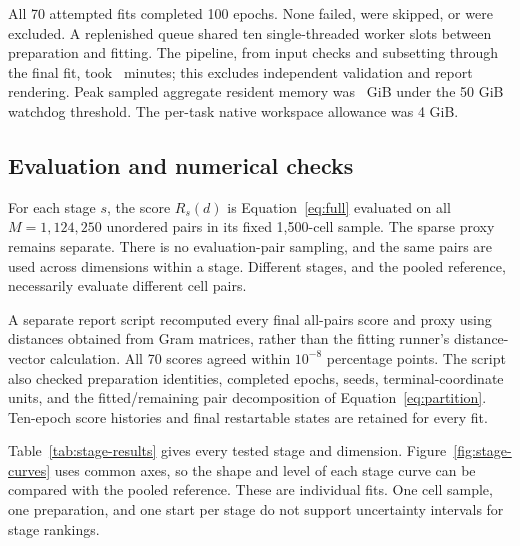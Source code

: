 All 70 attempted fits completed 100 epochs. None failed, were skipped, or
were excluded. A replenished queue shared ten single-threaded worker slots
between preparation and fitting. The pipeline, from input checks and
subsetting through the final fit, took \stageelapsedminutes\ minutes;
this excludes independent validation and report rendering. Peak sampled
aggregate resident memory was \stagepeakmemory\ GiB under the 50 GiB
watchdog threshold. The per-task native workspace allowance was 4 GiB.

\subsection{Evaluation and numerical checks}
For each stage $s$, the score $R_s(d)$ is Equation~\eqref{eq:full} evaluated
on all $M=1,124,250$ unordered pairs in its fixed 1,500-cell sample.
The sparse proxy remains separate. There is no evaluation-pair sampling,
and the same pairs are used across dimensions within a stage. Different
stages, and the pooled reference, necessarily evaluate different cell pairs.

A separate report script recomputed every final all-pairs score and proxy
using distances obtained from Gram matrices, rather than the fitting
runner's distance-vector calculation. All 70 scores agreed within
$10^{-8}$ percentage points. The script also checked preparation identities,
completed epochs, seeds, terminal-coordinate units, and the fitted/remaining
pair decomposition of Equation~\eqref{eq:partition}. Ten-epoch score histories
and final restartable states are retained for every fit.

Table~\ref{tab:stage-results} gives every tested stage and dimension.
Figure~\ref{fig:stage-curves} uses common axes, so the shape and level of
each stage curve can be compared with the pooled reference. These are
individual fits. One cell sample, one preparation, and one start per stage
do not support uncertainty intervals for stage rankings.

\begin{table}[htbp]
\centering\small
\caption{All-pairs RMS relative distance error (percent) after 100 SGD
epochs. Columns are output dimensions; rows are independent stage samples.
The pooled row repeats the existing mixed-stage sample at the same
dimensions. All targets use the same global 1,814-PC coordinate system,
but each row has its own cells and target distances. Lower is better for
that sample's reconstruction criterion; these are not matched-cell
comparisons or replicate means.}
\label{tab:stage-results}
\end{table}
\FloatBarrier


